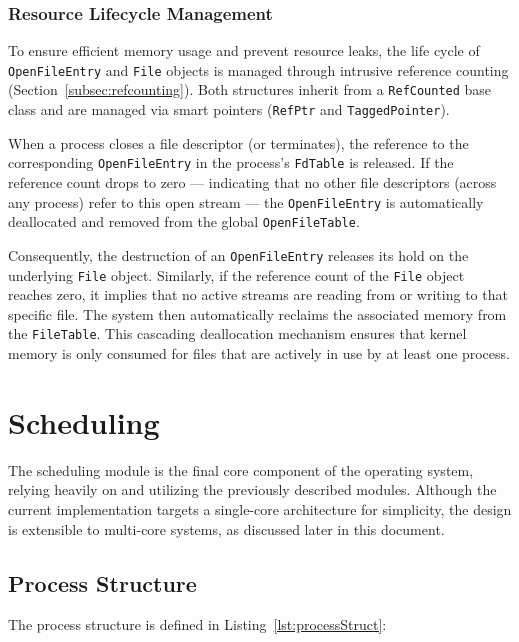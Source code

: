 \documentclass[a4paper,10pt,twoside]{report}
\theoremstyle{definition}
\begin{document}
\subsubsection{Resource Lifecycle Management}

To ensure efficient memory usage and prevent resource leaks, the life cycle of \texttt{OpenFileEntry} and \texttt{File} objects is managed through intrusive reference counting (Section~\ref{subsec:refcounting}). Both structures inherit from a \texttt{RefCounted} base class and are managed via smart pointers (\texttt{RefPtr} and \texttt{TaggedPointer}).

When a process closes a file descriptor (or terminates), the reference to the corresponding \texttt{OpenFileEntry} in the process's \texttt{FdTable} is released. If the reference count drops to zero --- indicating that no other file descriptors (across any process) refer to this open stream --- the \texttt{OpenFileEntry} is automatically deallocated and removed from the global \texttt{OpenFileTable}.

Consequently, the destruction of an \texttt{OpenFileEntry} releases its hold on the underlying \texttt{File} object. Similarly, if the reference count of the \texttt{File} object reaches zero, it implies that no active streams are reading from or writing to that specific file. The system then automatically reclaims the associated memory from the \texttt{FileTable}. This cascading deallocation mechanism ensures that kernel memory is only consumed for files that are actively in use by at least one process.

\section{Scheduling}
\label{sec:scheduling-impl}

The scheduling module is the final core component of the operating system, relying heavily on and utilizing the previously described modules. Although the current implementation targets a single-core architecture for simplicity, the design is extensible to multi-core systems, as discussed later in this document.

\subsection{Process Structure}

The process structure is defined in Listing~\ref{lst:processStruct}:

\clearpage
\end{document}
